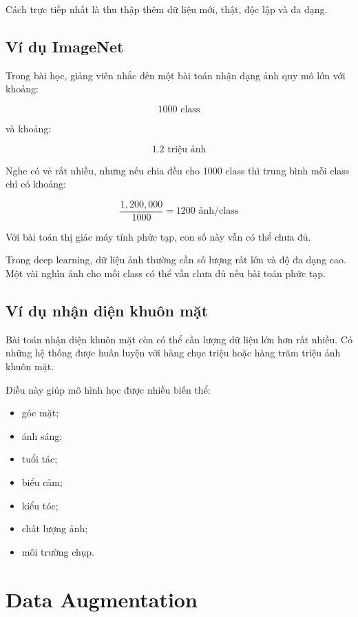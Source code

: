 Cách trực tiếp nhất là thu thập thêm dữ liệu mới, thật, độc lập và đa dạng.

\subsection{Ví dụ ImageNet}

Trong bài học, giảng viên nhắc đến một bài toán nhận dạng ảnh quy mô lớn với khoảng:

\[
    1000 \text{ class}
\]

và khoảng:

\[
    1.2 \text{ triệu ảnh}
\]

Nghe có vẻ rất nhiều, nhưng nếu chia đều cho 1000 class thì trung bình mỗi class chỉ có khoảng:

\[
    \frac{1,200,000}{1000}=1200 \text{ ảnh/class}
\]

Với bài toán thị giác máy tính phức tạp, con số này vẫn có thể chưa đủ.

\begin{ghinho}
Trong deep learning, dữ liệu ảnh thường cần số lượng rất lớn và độ đa dạng cao. Một vài nghìn ảnh cho mỗi class có thể vẫn chưa đủ nếu bài toán phức tạp.
\end{ghinho}

\subsection{Ví dụ nhận diện khuôn mặt}

Bài toán nhận diện khuôn mặt còn có thể cần lượng dữ liệu lớn hơn rất nhiều. Có những hệ thống được huấn luyện với hàng chục triệu hoặc hàng trăm triệu ảnh khuôn mặt.

Điều này giúp mô hình học được nhiều biến thể:

\begin{itemize}
    \item góc mặt;
    \item ánh sáng;
    \item tuổi tác;
    \item biểu cảm;
    \item kiểu tóc;
    \item chất lượng ảnh;
    \item môi trường chụp.
\end{itemize}

\section{Data Augmentation}

